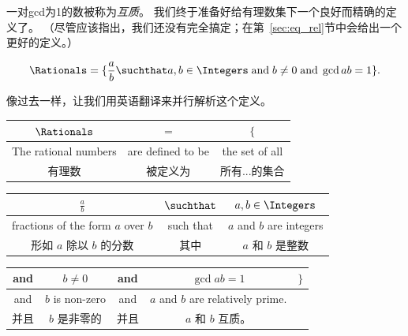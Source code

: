 一对gcd为1的数被称为\emph{互质}。
我们终于准备好给有理数集下一个良好而精确的定义了。
（尽管应该指出，我们还没有完全搞定；在第~\ref{sec:eq_rel}节中会给出一个更好的定义。）

\[ \Rationals = \{ \frac{a}{b} \suchthat a,b \in \Integers \; \mbox{and} \;
  b \neq 0 \; \mbox{and} \; \gcd{a}{b}=1 \}.
\]

像过去一样，让我们用英语翻译来并行解析这个定义。

\vspace{.2in}

\begin{tabular}{c|c|c}
  \rule[-10pt]{0pt}{22pt} $\Rationals$        & $=$               & $\{$           \\ \hline
  \rule[-6pt]{0pt}{22pt} The rational numbers & are defined to be & the set of all \\
  \rule[-6pt]{0pt}{22pt} 有理数               & 被定义为          & 所有...的集合  \\
\end{tabular}

\vspace{.2in}

\begin{tabular}{c|c|c}
  \rule[-10pt]{0pt}{22pt} $\displaystyle \frac{a}{b}$       & $\suchthat$              & $a,b \in \Integers$ \\ \hline
  \rule[-6pt]{0pt}{22pt} fractions of the form $a$ over $b$ & such that
                                                            & $a$ and $b$ are integers                       \\
  \rule[-6pt]{0pt}{22pt} 形如 $a$ 除以 $b$ 的分数           & 其中                     & $a$ 和 $b$ 是整数   \\
\end{tabular}

\vspace{.2in}

\begin{tabular}{c|c|c|c|c}
  \rule[-10pt]{0pt}{22pt} and  & $b \neq 0$      & and  & $\gcd{a}{b}=1$                    & $\}$
  \\ \hline
  \rule[-6pt]{0pt}{22pt}  and  & $b$ is non-zero & and  & $a$ and $b$ are relatively prime. &      \\
  \rule[-6pt]{0pt}{22pt}  并且 & $b$ 是非零的    & 并且 & $a$ 和 $b$ 互质。                 &      \\
\end{tabular}

